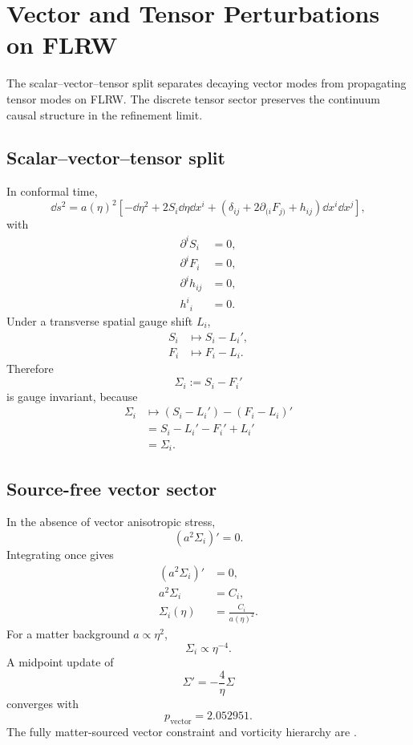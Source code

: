 \chapter{Vector and Tensor Perturbations on FLRW}

The scalar--vector--tensor split separates decaying vector modes from propagating tensor modes on FLRW.  The discrete tensor sector preserves the continuum causal structure in the refinement limit.

\allowdisplaybreaks

\section{Scalar--vector--tensor split}
In conformal time,
\begin{equation}
\dd s^2=a(\eta)^2
\left[
-\dd\eta^2
+2S_i\dd\eta\dd x^i
+\left(\delta_{ij}+2\partial_{(i}F_{j)}+h_{ij}\right)
\dd x^i\dd x^j
\right],
\end{equation}
with
\begin{align}
\partial^iS_i&=0,\\
\partial^iF_i&=0,\\
\partial^ih_{ij}&=0,\\
h^i{}_i&=0.
\end{align}
Under a transverse spatial gauge shift \(L_i\),
\begin{align}
S_i&\mapsto S_i-L_i',\\
F_i&\mapsto F_i-L_i.
\end{align}
Therefore
\begin{equation}
\boxed{
\Sigma_i:=S_i-F_i'
}
\end{equation}
is gauge invariant, because
\begin{align}
\Sigma_i
&\mapsto
(S_i-L_i')-(F_i-L_i)'\\
&=S_i-L_i'-F_i'+L_i'\\
&=\Sigma_i.
\end{align}

\section{Source-free vector sector}
In the absence of vector anisotropic stress,
\begin{equation}
\boxed{
(a^2\Sigma_i)'=0.
}
\end{equation}
Integrating once gives
\begin{align}
(a^2\Sigma_i)'&=0,\\
a^2\Sigma_i&=C_i,\\
\Sigma_i(\eta)&=\frac{C_i}{a(\eta)^2}.
\end{align}
For a matter background \(a\propto\eta^2\),
\begin{equation}
\Sigma_i\propto\eta^{-4}.
\end{equation}
A midpoint update of
\begin{equation}
\Sigma'=-\frac{4}{\eta}\Sigma
\end{equation}
converges with
\begin{equation}
p_{\mathrm{vector}}=2.052951.
\end{equation}
The fully matter-sourced vector constraint and vorticity hierarchy are .

